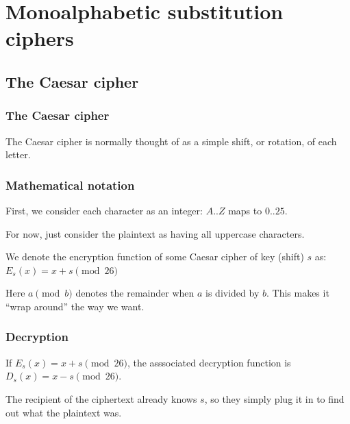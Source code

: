 \documentclass{beamer}
\begin{document}
\section{Monoalphabetic substitution ciphers}

\subsection{The Caesar cipher}

\begin{frame}
\frametitle{The Caesar cipher}
The Caesar cipher is normally thought of as a simple shift, or rotation, of each
letter.

\begin{center}
\begin{minipage}{6in}
  \hspace*{.2in}
\end{minipage}
\end{center}
\end{frame}

\begin{frame}
\frametitle{Mathematical notation}

First, we consider each character as an integer: $A..Z$ maps to $0..25$.

For now, just consider the plaintext as having all uppercase characters.

We denote the encryption function of some Caesar cipher of key (shift) $s$ as:
$E_s(x) = x + s \pmod{26}$

Here $a \pmod{b}$ denotes the remainder when $a$ is divided by $b$. This makes
it ``wrap around'' the way we want.
\end{frame}

\begin{frame}
\frametitle{Decryption}
If $E_s(x) = x + s \pmod{26}$, the asssociated decryption function is
$D_s(x) = x - s \pmod{26}$.

The recipient of the ciphertext already knows $s$, so they simply plug it in to
find out what the plaintext was.
\end{frame}
\end{document}
